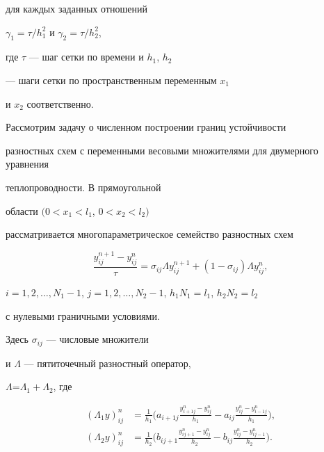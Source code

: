 для каждых заданных отношений


$\gamma_{1}=\tau /h_{1}^{2}$ и $\gamma_{2}=\tau /h_{2}^{2}$,


где $\tau$ --- шаг сетки по времени и $h_{1}$, $h_{2}$


--- шаги сетки по пространственным переменным $x_{1}$


и $x_{2}$ соответственно.





Рассмотрим задачу о численном построении границ устойчивости


разностных схем с переменными весовыми множителями для двумерного уравнения


теплопроводности. В прямоугольной


области $(0<x_1<l_1$, $0<x_2<l_2)$


рассматривается многопараметрическое семейство разностных схем


\begin{equation}


\label{7}


\frac{y_{ij}^{n+1}-y_{ij}^{n}}{\tau}=


\sigma_{ij}\Lambda y_{ij}^{n+1} +


(1-\sigma_{ij})\Lambda y_{ij}^{n},


\end{equation}


$i=1,2,\dotsc ,N_1-1$, $j=1,2,\dotsc ,N_2-1$, $h_{1}N_1=l_1$, $h_{2}N_2=l_2$


с нулевыми граничными условиями.


Здесь $\sigma_{ij}$ --- числовые множители


и $\Lambda$ --- пятиточечный разностный оператор,


$\Lambda$=$\Lambda_1+\Lambda_2$, где


\begin{align*}


(\Lambda_1 y)_{ij}^{n}&= \frac{1}{h_{1}}


\bigg(a_{i+1 j}\frac{y_{i+1j}^{n}-y_{i j}^{n}}{h_{1}} -


a_{i j}\frac{y_{ij}^{n}-y_{i-1j}^{n}}{h_{1}} \bigg), \\


%


(\Lambda_2 y)_{ij}^{n}&= \frac{1}{h_{2}}


\bigg(b_{i j+1}\frac{y_{ij+1}^{n}-y_{ij}^{n}}{h_{2}} -


b_{i j}\frac{y_{ij}^{n}-y_{ij-1}^{n}}{h_{2}} \bigg).


\end{align*}


